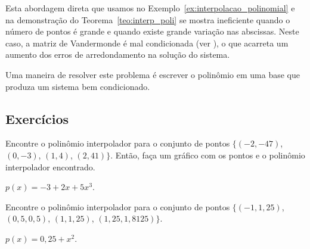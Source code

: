 
Esta abordagem direta que usamos no Exemplo~\ref{ex:interpolacao_polinomial} e na demonstração do Teorema~\ref{teo:interp_poli} se mostra ineficiente quando o número de pontos é grande e quando existe grande variação nas abscissas. Neste caso, a matriz de Vandermonde é mal condicionada (ver \cite{Gautschi}), o que acarreta um aumento dos erros de arredondamento na solução do sistema.

Uma maneira de resolver este problema é escrever o polinômio em uma base que produza um sistema bem condicionado.

\subsection*{Exercícios}

\begin{exer}\label{exer:interp1}
Encontre o polinômio interpolador para o conjunto de pontos $\{(-2, -47)$, $(0, -3)$, $(1, 4)$, $(2, 41)\}$. Então, faça um gráfico com os pontos e o polinômio interpolador encontrado.
\end{exer}
\begin{resp}
  $p(x) = -3 + 2x + 5x^3$.
\end{resp}

\begin{exer}
  Encontre o polinômio interpolador para o conjunto de pontos $\{(-1, 1,25)$, $(0,5, 0,5)$, $(1, 1,25)$, $(1,25, 1,8125)\}$.
\end{exer}
\begin{resp}
  $p(x) = 0,25 + x^2$.
\end{resp}


